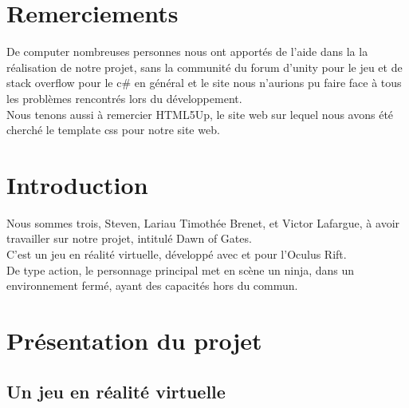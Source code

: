 \documentclass[12pt]{article}
\begin{document}
\newpage

\section*{Remerciements}

De \gls{computer} nombreuses personnes nous ont apportés de l'aide dans la la réalisation de notre projet, sans la communité du forum d'unity pour le jeu et de stack overflow pour le c\# en général et le site nous n'aurions pu faire face à tous les problèmes rencontrés lors du développement.\\
Nous tenons aussi à remercier HTML5Up, le site web sur lequel nous avons été cherché le template css pour notre site web.

\newpage

\section*{Introduction}

Nous sommes trois, Steven, Lariau Timothée Brenet, et Victor Lafargue, à avoir travailler sur notre projet, intitulé Dawn of Gates.\\
C'est un jeu en réalité virtuelle, développé avec et pour l'Oculus Rift.\\
De type action, le personnage principal met en scène un ninja, dans un environnement fermé, ayant des capacités hors du commun.

\newpage

\renewcommand{\contentsname}{Sommaire}
\tableofcontents

\newpage

\section{Présentation du projet}

\subsection{Un jeu en réalité virtuelle}
\end{document}
